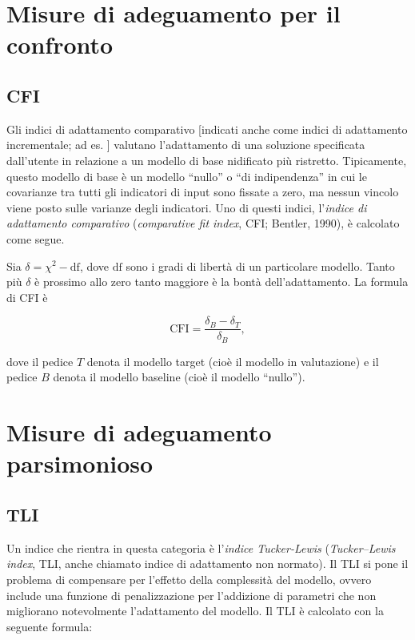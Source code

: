 \documentclass[
  11pt,
]{krantz}
\theoremstyle{definition}
\theoremstyle{definition}
\theoremstyle{definition}
\theoremstyle{definition}
\theoremstyle{remark}
\begin{document}
\hypertarget{misure-di-adeguamento-per-il-confronto}{%
\section{Misure di adeguamento per il confronto}\label{misure-di-adeguamento-per-il-confronto}}

\hypertarget{cfi}{%
\subsection{CFI}\label{cfi}}

Gli indici di adattamento comparativo {[}indicati anche come indici di adattamento incrementale; ad es. \citet{hu1998fit}{]} valutano l'adattamento di una soluzione specificata dall'utente in relazione a un modello di base nidificato più ristretto. Tipicamente, questo modello di base è un modello ``nullo'' o ``di indipendenza'' in cui le covarianze tra tutti gli indicatori di input sono fissate a zero, ma nessun vincolo viene posto sulle varianze degli indicatori. Uno di questi indici, l'\emph{indice di adattamento comparativo} (\emph{comparative fit index}, CFI; Bentler, 1990), è calcolato come segue.

Sia \(\delta = \chi^2 - \mbox{df}\), dove \(\mbox{df}\) sono i gradi di libertà di un particolare modello. Tanto più \(\delta\) è prossimo allo zero tanto maggiore è la bontà dell'adattamento. La formula di CFI è

\begin{equation}
\mbox{CFI} = \frac{\delta_B - \delta_T}{\delta_B},
\end{equation}

dove il pedice \(T\) denota il modello target (cioè il modello in valutazione) e il pedice \(B\) denota il modello baseline (cioè il modello ``nullo'').

\hypertarget{misure-di-adeguamento-parsimonioso}{%
\section{Misure di adeguamento parsimonioso}\label{misure-di-adeguamento-parsimonioso}}

\hypertarget{tli}{%
\subsection{TLI}\label{tli}}

Un indice che rientra in questa categoria è l'\emph{indice Tucker-Lewis} (\emph{Tucker--Lewis index}, TLI, anche chiamato indice di adattamento non normato). Il TLI si pone il problema di compensare per l'effetto della complessità del modello, ovvero include una funzione di penalizzazione per l'addizione di parametri che non migliorano notevolmente l'adattamento del modello. Il TLI è calcolato con la seguente formula:
\end{document}
